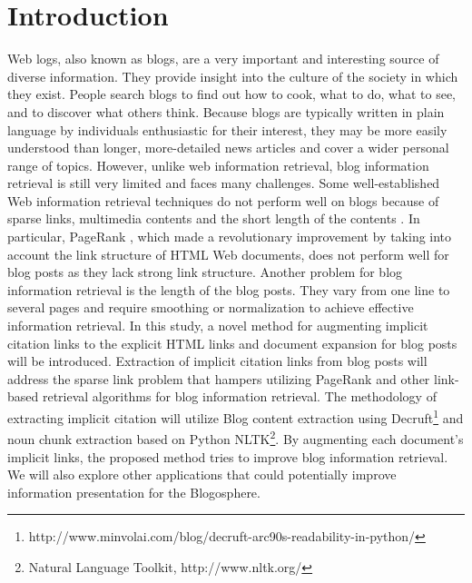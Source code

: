 \documentclass{sig-alternate}
\begin{document}



\section{Introduction}

Web logs, also known as blogs, are a very important and interesting source of diverse information. They provide insight into the culture of the society in which they exist. People search blogs to find out how to cook, what to do, what to see, and to discover what others think. Because blogs are typically written in plain language by individuals enthusiastic for their interest, they may be more easily understood than longer, more-detailed news articles and cover a wider personal range of topics. However, unlike web information retrieval, blog information retrieval is still very limited and faces many challenges. Some well-established Web information retrieval techniques do not perform well on blogs because of sparse links, multimedia contents and the short length of the contents \cite{Agarwal}. In particular, PageRank \cite{Brin1998a}, which made a revolutionary improvement by taking into account the link structure of HTML Web documents, does not perform well for blog posts as they lack strong link structure. Another problem for blog information retrieval is the length of the blog posts. They vary from one line to several pages and require smoothing or normalization to achieve effective information retrieval. 
	In this study, a novel method for augmenting implicit citation links to the explicit HTML links and document expansion for blog posts will be introduced. Extraction of implicit citation links from blog posts will address the sparse link problem that hampers utilizing PageRank and other link-based retrieval algorithms for blog information retrieval. The methodology of extracting implicit citation will utilize Blog content extraction using Decruft\footnote{http://www.minvolai.com/blog/decruft-arc90s-readability-in-python/} and noun chunk extraction based on Python NLTK\footnote{Natural Language Toolkit, http://www.nltk.org/}. By augmenting each document's implicit links, the proposed method tries to improve blog information retrieval. We will also explore other applications that could potentially improve information presentation for the Blogosphere.
\end{document}
